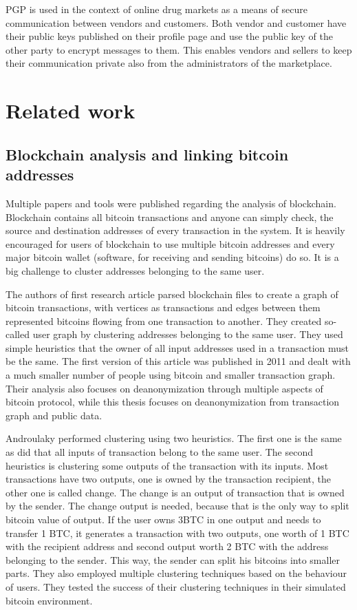 \documentclass[
  digital, %
  table,   %
  lof,     %
  lot,     %
  oneside
]{fithesis3}
\begin{document}
PGP is used in the context of online drug markets as a means of secure communication between vendors and customers.
Both vendor and customer have their public keys published on their profile page and use the public key of the other
party to encrypt messages to them. This enables vendors and sellers to keep their communication private also from the administrators of the marketplace.

\chapter{Related work}
\section{Blockchain analysis and linking bitcoin addresses}

Multiple papers and tools were published regarding the analysis of blockchain.
Blockchain contains all bitcoin transactions and anyone can simply check,
the source and destination addresses of every transaction in the system.
It is heavily encouraged for users of blockchain to use multiple bitcoin addresses
 and every major bitcoin wallet (software, for receiving and sending bitcoins) do so.
 It is a big challenge to cluster addresses belonging to the same user.
 
The authors of first research article \parencite{reid2013analysis}
 parsed blockchain files to create a graph of bitcoin transactions, with vertices as transactions
 and edges between them represented bitcoins flowing from one transaction to another.
 They created so-called user graph by clustering addresses belonging to the same user.
 They used simple heuristics that the owner of all input addresses used in a transaction must be the same. The first version of this article  
was published in 2011 and dealt with a much smaller number of people using bitcoin and smaller transaction graph.
Their analysis also focuses on deanonymization through multiple aspects of bitcoin protocol,
while this thesis focuses on deanonymization from transaction graph and public data.

Androulaky \parencite{androulaki2013evaluating} performed clustering using two heuristics.
The first one is the same as \parencite{reid2013analysis} did that all inputs of transaction
belong to the same user. The second heuristics is clustering some outputs of the transaction with its inputs.
Most transactions have two outputs, one is owned by the transaction recipient,
the other one is called change. The change is an output of transaction that is owned by
the sender. The change output is needed, because that is the only way to split bitcoin value of output.
 If the user owns 3BTC in one output and needs to transfer 1 BTC, it generates a transaction with two outputs, one worth of 1 BTC with the recipient address and second output worth 2 BTC 
 with the address belonging to the sender. This way, the sender can split his bitcoins into smaller parts.
 They also employed multiple clustering techniques based on the behaviour of users.
 They tested the success of their clustering techniques in their simulated bitcoin 
 environment.
\end{document}
